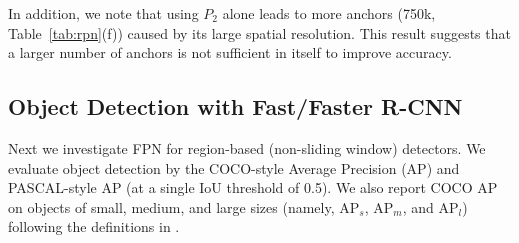 \documentclass[10pt,twocolumn,letterpaper]{article}
\begin{document}
In addition, we note that using $P_2$ alone leads to more anchors (750k, Table~\ref{tab:rpn}(f)) caused by its large spatial resolution. This result suggests that a larger number of anchors is not sufficient in itself to improve accuracy.

\subsection{Object Detection with Fast/Faster R-CNN}
\label{sec:frcn_details}

Next we investigate FPN for region-based (non-sliding window) detectors. 
We evaluate object detection by the COCO-style Average Precision (AP) and PASCAL-style AP (at a single IoU threshold of 0.5).
We also report COCO AP on objects of small, medium, and large sizes (namely, AP$_s$, AP$_m$, and AP$_l$) following the definitions in \cite{Lin2014}.
\end{document}
